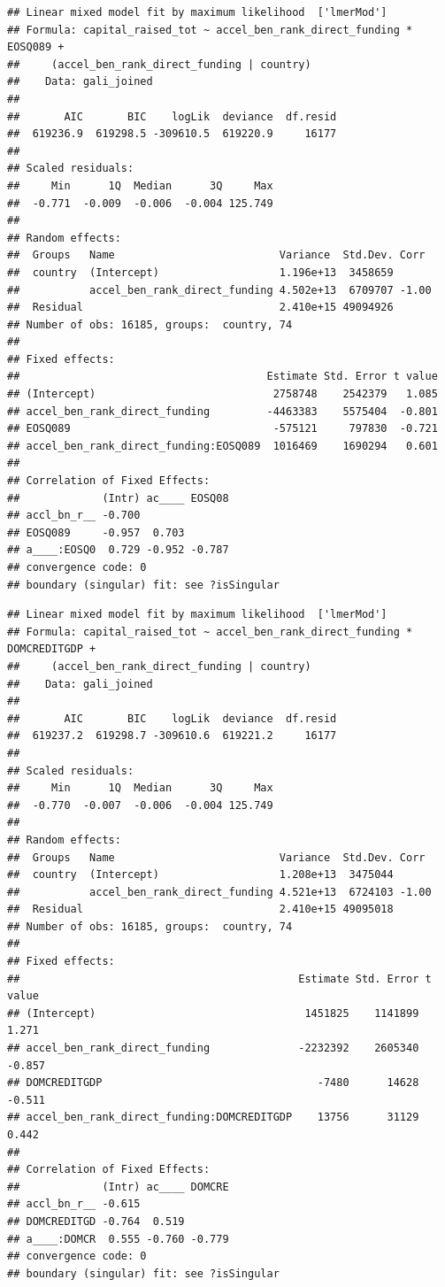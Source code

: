 \documentclass[
  english,
  man]{apa6}
\begin{document}
\begin{verbatim}
## Linear mixed model fit by maximum likelihood  ['lmerMod']
## Formula: capital_raised_tot ~ accel_ben_rank_direct_funding * EOSQ089 +  
##     (accel_ben_rank_direct_funding | country)
##    Data: gali_joined
## 
##       AIC       BIC    logLik  deviance  df.resid 
##  619236.9  619298.5 -309610.5  619220.9     16177 
## 
## Scaled residuals: 
##     Min      1Q  Median      3Q     Max 
##  -0.771  -0.009  -0.006  -0.004 125.749 
## 
## Random effects:
##  Groups   Name                          Variance  Std.Dev. Corr 
##  country  (Intercept)                   1.196e+13  3458659      
##           accel_ben_rank_direct_funding 4.502e+13  6709707 -1.00
##  Residual                               2.410e+15 49094926      
## Number of obs: 16185, groups:  country, 74
## 
## Fixed effects:
##                                       Estimate Std. Error t value
## (Intercept)                            2758748    2542379   1.085
## accel_ben_rank_direct_funding         -4463383    5575404  -0.801
## EOSQ089                                -575121     797830  -0.721
## accel_ben_rank_direct_funding:EOSQ089  1016469    1690294   0.601
## 
## Correlation of Fixed Effects:
##             (Intr) ac____ EOSQ08
## accl_bn_r__ -0.700              
## EOSQ089     -0.957  0.703       
## a____:EOSQ0  0.729 -0.952 -0.787
## convergence code: 0
## boundary (singular) fit: see ?isSingular
\end{verbatim}

\begin{verbatim}
## Linear mixed model fit by maximum likelihood  ['lmerMod']
## Formula: capital_raised_tot ~ accel_ben_rank_direct_funding * DOMCREDITGDP +  
##     (accel_ben_rank_direct_funding | country)
##    Data: gali_joined
## 
##       AIC       BIC    logLik  deviance  df.resid 
##  619237.2  619298.7 -309610.6  619221.2     16177 
## 
## Scaled residuals: 
##     Min      1Q  Median      3Q     Max 
##  -0.770  -0.007  -0.006  -0.004 125.749 
## 
## Random effects:
##  Groups   Name                          Variance  Std.Dev. Corr 
##  country  (Intercept)                   1.208e+13  3475044      
##           accel_ben_rank_direct_funding 4.521e+13  6724103 -1.00
##  Residual                               2.410e+15 49095018      
## Number of obs: 16185, groups:  country, 74
## 
## Fixed effects:
##                                            Estimate Std. Error t value
## (Intercept)                                 1451825    1141899   1.271
## accel_ben_rank_direct_funding              -2232392    2605340  -0.857
## DOMCREDITGDP                                  -7480      14628  -0.511
## accel_ben_rank_direct_funding:DOMCREDITGDP    13756      31129   0.442
## 
## Correlation of Fixed Effects:
##             (Intr) ac____ DOMCRE
## accl_bn_r__ -0.615              
## DOMCREDITGD -0.764  0.519       
## a____:DOMCR  0.555 -0.760 -0.779
## convergence code: 0
## boundary (singular) fit: see ?isSingular
\end{verbatim}
\end{document}
